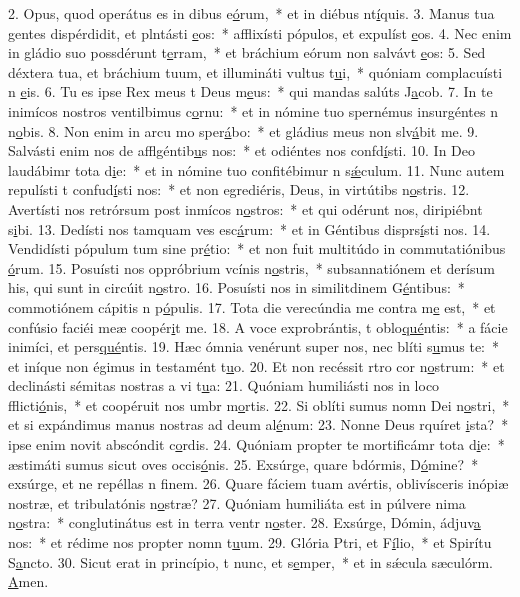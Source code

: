 2. Opus, quod operátus es in dibus e\uline{ó}rum,~* et in diébus nt\uline{í}quis.
3. Manus tua gentes dispérdidit, et plntásti \uline{e}os:~* afflixísti pópulos, et expulíst \uline{e}os.
4. Nec enim in gládio suo possdérunt t\uline{e}rram,~* et bráchium eórum non salvávt \uline{e}os:
5. Sed déxtera tua, et bráchium tuum, et illumináti vultus t\uline{u}i,~* quóniam complacuísti n \uline{e}is.
6. Tu es ipse Rex meus t Deus m\uline{e}us:~* qui mandas salúts J\uline{a}cob.
7. In te inimícos nostros ventilbimus c\uline{o}rnu:~* et in nómine tuo spernémus insurgéntes n n\uline{o}bis.
8. Non enim in arcu mo sper\uline{á}bo:~* et gládius meus non slv\uline{á}bit me.
9. Salvásti enim nos de afflgéntib\uline{u}s nos:~* et odiéntes nos confd\uline{í}sti.
10. In Deo laudábimr tota d\uline{i}e:~* et in nómine tuo confitébimur n s\uline{ǽ}culum.
11. Nunc autem repulísti t confud\uline{í}sti nos:~* et non egrediéris, Deus, in virtútibs n\uline{o}stris.
12. Avertísti nos retrórsum post inmícos n\uline{o}stros:~* et qui odérunt nos, diripiébnt s\uline{i}bi.
13. Dedísti nos tamquam ves esc\uline{á}rum:~* et in Géntibus disprs\uline{í}sti nos.
14. Vendidísti pópulum tum sine pr\uline{é}tio:~* et non fuit multitúdo in commutatiónibus \uline{ó}rum.
15. Posuísti nos oppróbrium vcínis n\uline{o}stris,~* subsannatiónem et derísum his, qui sunt in circúit n\uline{o}stro.
16. Posuísti nos in similitdinem G\uline{é}ntibus:~* commotiónem cápitis n p\uline{ó}pulis.
17. Tota die verecúndia me contra m\uline{e} est,~* et confúsio faciéi meæ coopér\uline{i}t me.
18. A voce exprobrántis, t oblo\uline{qué}ntis:~* a fácie inimíci, et pers\uline{qué}ntis.
19. Hæc ómnia venérunt super nos, nec blíti s\uline{u}mus te:~* et iníque non égimus in testamént t\uline{u}o.
20. Et non recéssit rtro cor n\uline{o}strum:~* et declinásti sémitas nostras a vi t\uline{u}a:
21. Quóniam humiliásti nos in loco fflicti\uline{ó}nis,~* et coopéruit nos umbr m\uline{o}rtis.
22. Si oblíti sumus nomn Dei n\uline{o}stri,~* et si expándimus manus nostras ad deum al\uline{é}num:
23. Nonne Deus rquíret \uline{i}sta?~* ipse enim novit abscóndit c\uline{o}rdis.
24. Quóniam propter te mortificámr tota d\uline{i}e:~* æstimáti sumus sicut oves occis\uline{ó}nis.
25. Exsúrge, quare bdórmis, D\uline{ó}mine?~* exsúrge, et ne repéllas n f\uline{i}nem.
26. Quare fáciem tuam avértis, oblivísceris inópiæ nostræ, et tribulatónis n\uline{o}stræ?
27. Quóniam humiliáta est in púlvere nima n\uline{o}stra:~* conglutinátus est in terra ventr n\uline{o}ster.
28. Exsúrge, Dómin, ádjuv\uline{a} nos:~* et rédime nos propter nomn t\uline{u}um.
29. Glória Ptri, et F\uline{í}lio,~* et Spirítu S\uline{a}ncto.
30. Sicut erat in princípio, t nunc, et s\uline{e}mper,~* et in sǽcula sæculórm. \uline{A}men.
